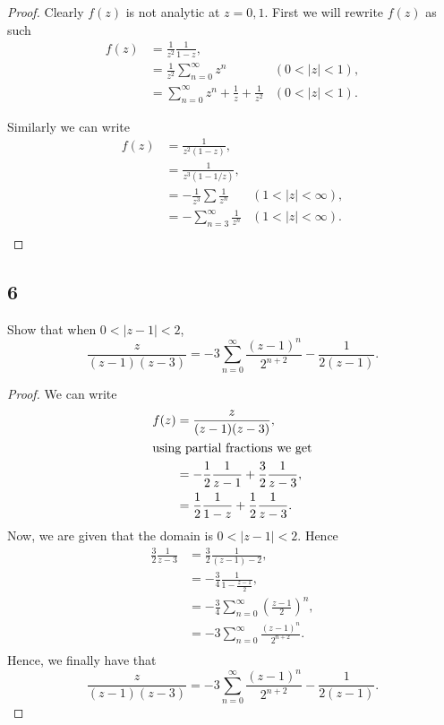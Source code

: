 \documentclass{article}
\begin{document}
\begin{proof}
    Clearly $f(z)$ is not analytic at $z=0,1$. First we will rewrite $f(z)$ as such
    \begin{align*}
        f(z) & = \frac{1}{z^2}\frac{1}{1-z},                                         \\
             & = \frac{1}{z^2}\sum_{n=0}^\infty z^n                 & (0 < |z| < 1), \\
             & = \sum_{n=0}^\infty z^n +\frac{1}{z} + \frac{1}{z^2} & (0 < |z| < 1).
    \end{align*}

    Similarly we can write
    \begin{align*}
        f(z) & =  \frac{1}{z^2(1-z)},                                \\
             & = \frac{1}{z^3(1-1/z)},                               \\
             & = -\frac{1}{z^3} \sum \frac{1}{z^n} & (1<|z|<\infty), \\
             & = -\sum_{n=3}^\infty\frac{1}{z^n}   & (1<|z|<\infty). \\
    \end{align*}
\end{proof}

\subsection*{6}
Show that when $0<|z-1|<2$,
\[\frac{z}{(z-1)(z-3)}= -3\sum_{n=0}^\infty \frac{(z-1)^n}{2^{n+2}} - \frac{1}{2(z-1)}.\]

\begin{proof}
    We can write
    \begin{align*}
        f(z) & = \frac{z}{(z-1)(z-3)},                                   \\
        \intertext{using partial fractions we get}
             & = -\frac{1}{2}\frac{1}{z-1} + \frac{3}{2}\frac{1}{z - 3}, \\
             & = \frac{1}{2}\frac{1}{1-z} + \frac{1}{2}\frac{1}{z-3}.
    \end{align*}
    Now, we are given that the domain is $0<|z-1|<2$. Hence
    \begin{align*}
        \frac{3}{2}\frac{1}{z-3} & = \frac{3}{2}\frac{1}{(z-1)-2},                               \\
                                 & = -\frac{3}{4}\frac{1}{1-\frac{z-1}{2}},                      \\
                                 & = -\frac{3}{4}\sum_{n=0}^\infty \left(\frac{z-1}{2}\right)^n, \\
                                 & = -3\sum_{n=0}^\infty \frac{(z-1)^n}{2^{n+2}}.                \\
    \end{align*}
    Hence, we finally have that
    \[\frac{z}{(z-1)(z-3)}= -3\sum_{n=0}^\infty \frac{(z-1)^n}{2^{n+2}} - \frac{1}{2(z-1)}.\]
\end{proof}
\end{document}
